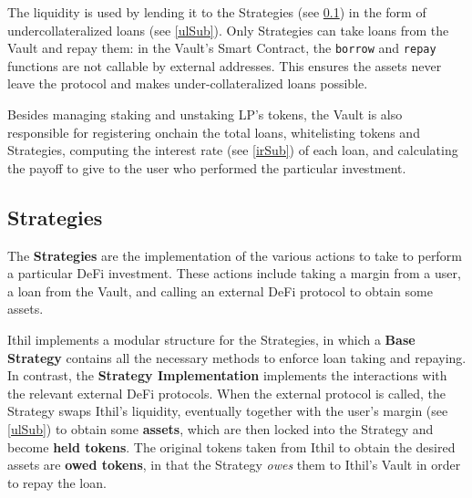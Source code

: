 \documentclass[a4paper,10 pt]{article}
\theoremstyle{definition}
\begin{document}
The liquidity is used by lending it to the Strategies (see \ref{stratSub}) in the form of undercollateralized loans (see \ref{ulSub}). Only Strategies can take loans from the Vault and repay them: in the Vault's Smart Contract, the \verb|borrow| and \verb|repay| functions are not callable by external addresses. This ensures the assets never leave the protocol and makes under-collateralized loans possible.

Besides managing staking and unstaking LP's tokens, the Vault is also responsible for registering onchain the total loans, whitelisting tokens and Strategies, computing the interest rate (see \ref{irSub}) of each loan, and calculating the payoff to give to the user who performed the particular investment.

\subsection{Strategies}\label{stratSub}

The {\bf Strategies} are the implementation of the various actions to take to perform a particular DeFi investment. These actions include taking a margin from a user, a loan from the Vault, and calling an external DeFi protocol to obtain some assets.

Ithil implements a modular structure for the Strategies, in which a {\bf Base Strategy} contains all the necessary methods to enforce loan taking and repaying. In contrast, the {\bf Strategy Implementation} implements the interactions with the relevant external DeFi protocols. When the external protocol is called, the Strategy swaps Ithil's liquidity, eventually together with the user's margin (see \ref{ulSub}) to obtain some {\bf assets}, which are then locked into the Strategy and become {\bf held tokens}. The original tokens taken from Ithil to obtain the desired assets are {\bf owed tokens}, in that the Strategy {\it owes} them to Ithil's Vault in order to repay the loan.
\end{document}
